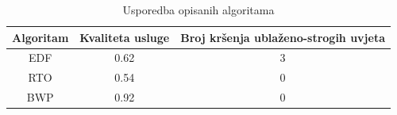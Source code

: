 \documentclass[../zavrsni.tex]{subfiles}
\begin{document}
\begin{table}[h!]
  \begin{center}
    \begin{tabular}{||c || c | c ||} 
     \hline
     Algoritam & Kvaliteta usluge & Broj kršenja ublaženo-strogih uvjeta \\ [0.5ex] 
     \hline\hline
     EDF & 0.62 & 3 \\ 
     \hline
     RTO & 0.54 & 0 \\
     \hline
     BWP & 0.92 & 0 \\
     \hline
    \end{tabular}
  \end{center}
  \caption{\label{tab:table-name}Usporedba opisanih algoritama}
  \end{table}
\end{document}
